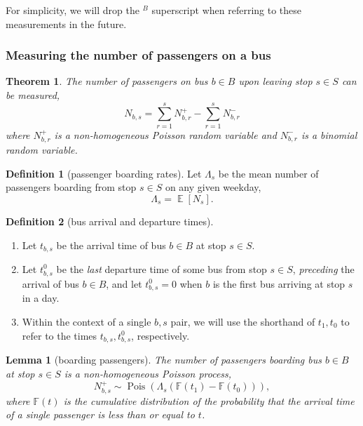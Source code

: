 \documentclass[12pt]{article}
\newtheorem{theorem}{Theorem}
\newtheorem{lemma}{Lemma}
\theoremstyle{definition}
\newtheorem{definition}{Definition}
\DeclareMathOperator{\Exp}{\mathbb E}
\DeclareMathOperator{\Pois}{Pois}
\begin{document}
For simplicity, we will drop the $^B$ superscript when referring to these
measurements in the future.

\subsubsection{Measuring the number of passengers on a bus}
\label{sec:num-passengers}

\begin{theorem}
    The number of passengers on bus $b \in B$ upon leaving stop $s \in S$ can
    be measured,
    \[
        N_{b,s} = \sum_{r=1}^s N^+_{b,r} - \sum_{r=1}^s N^-_{b,r}
    \]
    where $N^+_{b,r}$ is a non-homogeneous Poisson random variable and
    $N^-_{b,r}$ is a binomial random variable.
\end{theorem}

\begin{definition}[passenger boarding rates]
    \hfill\par\nopagebreak
    Let $\Lambda_s$ be the mean number of passengers boarding from stop $s
    \in S$ on any given weekday,
    \[
        \Lambda_s = \Exp[N_s].
    \]
\end{definition}

\begin{definition}[bus arrival and departure times]
    \hfill
    \begin{enumerate}
        \item Let $t_{b,s}$ be the arrival time of bus $b \in B$ at stop $s \in S$.
        \item Let $t^0_{b,s}$ be the \emph{last} departure time of some bus
            from stop $s \in S$, \emph{preceding} the arrival of bus $b \in
            B$, and let $t^0_{b,s} = 0$ when $b$ is the first bus arriving at
            stop $s$ in a day.
        \item Within the context of a single $b,s$ pair, we will use the
            shorthand of $t_1, t_0$ to refer to the times $t_{b,s},
            t^0_{b,s}$, respectively.
    \end{enumerate}
\end{definition}

\begin{lemma}[boarding passengers]
    The number of passengers boarding bus $b \in B$ at stop $s \in
    S$ is a non-homogeneous Poisson process,
    \[
        N^+_{b,s} \sim \Pois(\Lambda_s
        \left(\mathbb F(t_1) - \mathbb F(t_0)\right)),
    \]
    where $\mathbb F(t)$ is the cumulative distribution of the
    probability that the arrival time of a single passenger is less
    than or equal to $t$.
\end{lemma}
\end{document}
